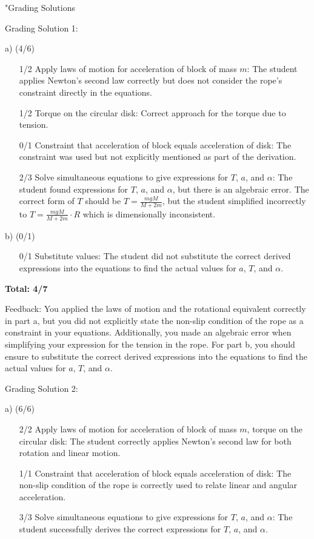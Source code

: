 \documentclass[a4paper,11pt]{article}
\begin{document}
"Grading Solutions

Grading Solution 1:

a) (4/6)
\begin{itemize}
    \item[1/2] Apply laws of motion for acceleration of block of mass $m$: The student applies Newton's second law correctly but does not consider the rope's constraint directly in the equations.
    \item[1/2] Torque on the circular disk: Correct approach for the torque due to tension.
    \item[0/1] Constraint that acceleration of block equals acceleration of disk: The constraint was used but not explicitly mentioned as part of the derivation.
    \item[2/3] Solve simultaneous equations to give expressions for $T$, $a$, and $ \alpha $: The student found expressions for $T$, $a$, and $ \alpha $, but there is an algebraic error. The correct form of $T$ should be $T = \frac{mgM}{M + 2m}$, but the student simplified incorrectly to $T = \frac{mgM}{M + 2m} \cdot R$ which is dimensionally inconsistent.
\end{itemize}

b) (0/1)
\begin{itemize}
    \item[0/1] Substitute values: The student did not substitute the correct derived expressions into the equations to find the actual values for $a$, $T$, and $ \alpha $.
\end{itemize}

\textbf{Total: 4/7}

Feedback: You applied the laws of motion and the rotational equivalent correctly in part a, but you did not explicitly state the non-slip condition of the rope as a constraint in your equations. Additionally, you made an algebraic error when simplifying your expression for the tension in the rope. For part b, you should ensure to substitute the correct derived expressions into the equations to find the actual values for $a$, $T$, and $ \alpha $.

Grading Solution 2:

a) (6/6)
\begin{itemize}
    \item[2/2] Apply laws of motion for acceleration of block of mass $m$, torque on the circular disk: The student correctly applies Newton's second law for both rotation and linear motion.
    \item[1/1] Constraint that acceleration of block equals acceleration of disk: The non-slip condition of the rope is correctly used to relate linear and angular acceleration.
    \item[3/3] Solve simultaneous equations to give expressions for $T$, $a$, and $ \alpha $: The student successfully derives the correct expressions for $T$, $a$, and $ \alpha $.
\end{itemize}
\end{document}
